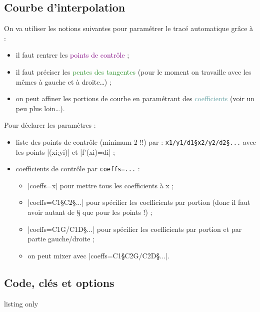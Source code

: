 \documentclass[a4paper,french,11pt]{article}
\newcommand\ctex[1]{\tcbox[vignettelatex]{#1}}
\begin{document}
\subsection{Courbe d'interpolation}

\begin{noteblock}
On va utiliser les notions suivantes pour paramétrer le tracé \og automatique \fg{} grâce à  \ctex{..controls} :
%
\begin{itemize}
	\item il faut rentrer les \textcolor{purple}{\textsf{points de contrôle}} ;
	\item il faut préciser les \textcolor{ForestGreen}{\textsf{pentes des tangentes}} (pour le moment on travaille avec les mêmes à gauche et à droite\ldots) ;
	\item on peut \og affiner \fg{} les portions de courbe en paramétrant des \textcolor{CadetBlue}{\textsf{coefficients}} (voir un peu plus loin\ldots).
\end{itemize}

\medskip

Pour déclarer les paramètres :
%
\begin{itemize}
	\item liste des points de contrôle (minimum 2 !!) par : \verb|x1/y1/d1§x2/y2/d2§...| avec les points \pverb|(xi;yi)| et \vverb|f'(xi)=di| ;
	\item coefficients de contrôle par \verb|coeffs=...| :
	\begin{itemize}
		\item \averb|coeffs=x| pour mettre tous les coefficients à x ;
		\item \averb|coeffs=C1§C2§...| pour spécifier les coefficients par portion (donc il faut avoir autant de § que pour les points !) ;
		\item \averb|coeffs=C1G/C1D§...| pour spécifier les coefficients par portion et par partie gauche/droite ;
		\item on peut mixer avec \averb|coeffs=C1§C2G/C2D§...|.
	\end{itemize}
\end{itemize}
\vspace*{-\baselineskip}\leavevmode
\end{noteblock}

\subsection{Code, clés et options}

\begin{PresCodeTexPL}{listing only}
\end{PresCodeTexPL}
\end{document}
